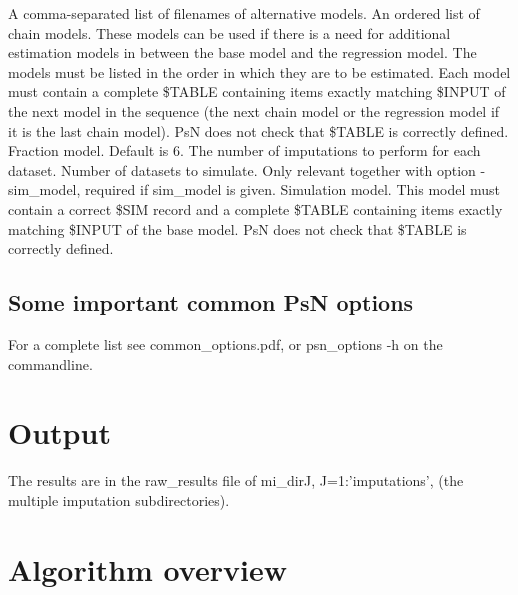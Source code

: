 \begin{optionlist}
A comma-separated list of filenames of alternative models. 
\nextopt
{}
An ordered list of chain models. These models can be used if there is a need for additional estimation models in between the base model and the regression model. The models must be listed in the order in which they are to be estimated. Each model must contain a complete \$TABLE containing items exactly matching \$INPUT of the next model in the sequence (the next chain model or the regression model if it is the last chain model). PsN does not check that \$TABLE is correctly defined.   
\nextopt
{}
Fraction model.
\nextopt
{}
Default is 6. The number of imputations to perform for each dataset. 
\nextopt
{}
Number of datasets to simulate. Only relevant together with option -sim\_model, required if sim\_model is given. 
\nextopt
{}
Simulation model. This model must contain a correct \$SIM record and a complete \$TABLE containing items exactly matching \$INPUT of the base model. PsN does not check that \$TABLE is correctly defined. 
\nextopt
\end{optionlist}

\subsection{Some important common PsN options}
For a complete list see common\_options.pdf, 
or psn\_options -h on the commandline.



\section{Output}
The results are in the raw\_results file of mi\_dirJ, J=1:'imputations', (the multiple imputation subdirectories).

\section{Algorithm overview}

